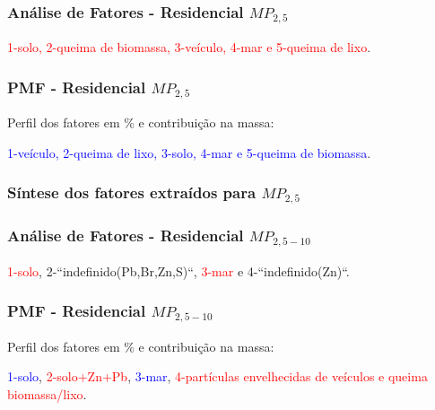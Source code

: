 \begin{frame}
  \frametitle{Análise de Fatores - Residencial $MP_{2,5}$}        
  \begin{table}[H]
    \centering
    \tiny
    
  \end{table}
  \textcolor{red}{1-solo, 2-queima de biomassa, 3-veículo, 4-mar e 5-queima de lixo}. 
\end{frame}

\begin{frame}
  \frametitle{PMF - Residencial $MP_{2,5}$}
  Perfil dos fatores em \% e contribuição na massa:
  
    \begin{table}[H]
    	\centering
    	\tiny  
              
    \end{table}
      
      \textcolor{blue}{1-veículo, 2-queima de lixo, 3-solo, 4-mar e 5-queima de biomassa}. 
\end{frame}


\begin{frame}
  \frametitle{Síntese dos fatores extraídos para $MP_{2,5}$}
  \begin{table}[H]
    \centering
    \tiny
    
  \end{table}
  
    \begin{table}[H]
    	\centering
    	\tiny
    	
    \end{table}
\end{frame}

\begin{frame}
  \frametitle{Análise de Fatores - Residencial $MP_{2,5-10}$}        
  \begin{table}[H]
    \centering
    \tiny
    
  \end{table}
        \textcolor{red}{1-solo}, 2-``indefinido(Pb,Br,Zn,S)``, \textcolor{red}{3-mar} e 4-``indefinido(Zn)``.
\end{frame}


\begin{frame}
  \frametitle{PMF - Residencial $MP_{2,5-10}$}
  Perfil dos fatores em \% e contribuição na massa:      
	\begin{table}[H]
		\centering
		\tiny
              
	\end{table}
	\textcolor{blue}{1-solo}, \textcolor{red}{2-solo+Zn+Pb}, \textcolor{blue}{3-mar},
	\textcolor{red}{4-partículas envelhecidas de veículos e queima biomassa/lixo}.
\end{frame}

